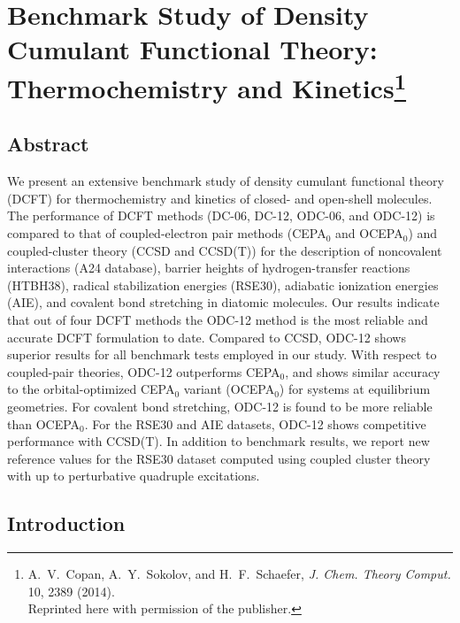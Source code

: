 \chapter[%
    Benchmark Study of Density Cumulant Functional Theory:\\
    Thermochemistry and Kinetics
]{%
    Benchmark Study of Density Cumulant Functional Theory:\\
    Thermochemistry and Kinetics\footnote{%
        A.~V.~Copan,
	    A.~Y.~Sokolov, and
        H.~F.~Schaefer,
        {\itshape J. Chem. Theory Comput.}
        10, 2389 (2014).\\
        Reprinted here with permission of the publisher.
    }
}
\label{ch:benchmark}

\newpage
\section{Abstract}
We present an extensive benchmark study of density cumulant functional theory
(DCFT) for thermochemistry and kinetics of closed- and open-shell molecules. The
performance of DCFT methods (DC-06, DC-12, ODC-06, and ODC-12) is compared to
that of coupled-electron pair methods (CEPA$_0$ and OCEPA$_0$) and
coupled-cluster theory (CCSD and CCSD(T)) for the description of noncovalent
interactions (A24 database), barrier heights of hydrogen-transfer reactions
(HTBH38), radical stabilization energies (RSE30), adiabatic ionization energies
(AIE), and covalent bond stretching in diatomic molecules. Our results indicate
that out of four DCFT methods the ODC-12 method is the most reliable and
accurate DCFT formulation to date. Compared to CCSD, ODC-12 shows superior
results for all benchmark tests employed in our study. With respect to
coupled-pair theories, ODC-12 outperforms CEPA$_0$, and shows similar accuracy
to the orbital-optimized CEPA$_0$ variant (OCEPA$_0$) for systems at equilibrium
geometries. For covalent bond stretching, ODC-12 is found to be more reliable
than OCEPA$_0$. For the RSE30 and AIE datasets, ODC-12 shows competitive
performance with CCSD(T). In addition to benchmark results, we report new
reference values for the RSE30 dataset computed using coupled cluster theory
with up to perturbative quadruple excitations.


\section{Introduction}

